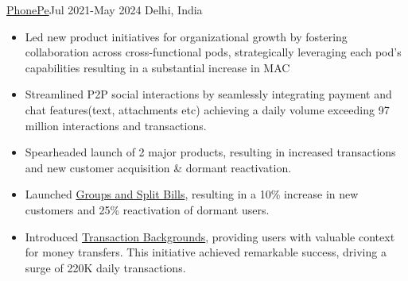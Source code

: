 \documentclass[10pt,a4paper,ragged2e]{altacv}
\begin{document}
 {\color{mecol}\href{https://www.phonepe.com/}{PhonePe}}{Jul 2021-May 2024 }{Delhi, India}
\begin{itemize}


\item {Led new product initiatives for organizational growth by fostering collaboration across cross-functional pods, strategically leveraging each pod's capabilities resulting in a substantial increase in MAC}
\item {Streamlined P2P social interactions by seamlessly integrating payment and chat features(text, attachments etc) achieving a daily volume exceeding 97 million interactions and transactions. }
\item {Spearheaded launch of 2 major products, resulting in increased transactions and new customer acquisition \& dormant reactivation.}
\item {Launched \href{https://www.phonepe.com/blog/design/phonepes-split-expenses-streamlining-group-transactions-with-ease/}{Groups and Split Bills}, resulting in a 10\% increase in new customers and 25\% reactivation of dormant users.  }
\item { Introduced \href{https://www.instagram.com/s/aGlnaGxpZ2h0OjE3OTA3NTEwMjY4NzE2NDQ5?story_media_id=2931443902160263738&igsh=ejYyejBzODgxeXll}{Transaction Backgrounds}, providing users with valuable context for money transfers. This initiative achieved remarkable success, driving a surge of 220K daily transactions. }




\end{itemize}
\divider
\end{document}

